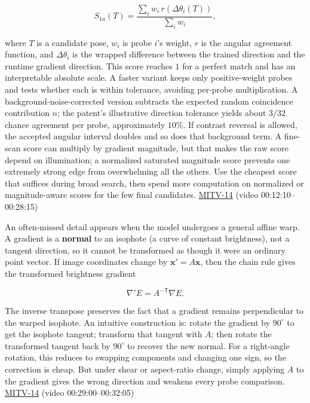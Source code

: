 \[
S_{1a}(T)=\frac{\sum_i w_i\,r(\Delta\theta_i(T))}{\sum_i w_i},
\]

where \(T\) is a candidate pose, \(w_i\) is probe \(i\)'s weight, \(r\) is the angular agreement function, and \(\Delta\theta_i\) is the wrapped difference between the trained direction and the runtime gradient direction. This score reaches \(1\) for a perfect match and has an interpretable absolute scale. A faster variant keeps only positive-weight probes and tests whether each is within tolerance, avoiding per-probe multiplication. A background-noise-corrected version subtracts the expected random coincidence contribution \(n\); the patent's illustrative direction tolerance yields about \(3/32\) chance agreement per probe, approximately \(10\%\). If contrast reversal is allowed, the accepted angular interval doubles and so does that background term. A fine-scan score can multiply by gradient magnitude, but that makes the raw score depend on illumination; a normalized saturated magnitude score prevents one extremely strong edge from overwhelming all the others. Use the cheapest score that suffices during broad search, then spend more computation on normalized or magnitude-aware scores for the few final candidates. \hyperref[04-visual-computing-ii-ch036-mitv-14---inspection-in-patquick-hough-transform-homography-position-determination-multi-scale]{MITV-14} (video 00:12:10--00:28:15)

An often-missed detail appears when the model undergoes a general affine warp. A gradient is a \textbf{normal} to an isophote (a curve of constant brightness), not a tangent direction, so it cannot be transformed as though it were an ordinary point vector. If image coordinates change by \(\mathbf{x}'=A\mathbf{x}\), then the chain rule gives the transformed brightness gradient

\[
\nabla' E=A^{-\mathsf T}\nabla E.
\]

The inverse transpose preserves the fact that a gradient remains perpendicular to the warped isophote. An intuitive construction is: rotate the gradient by \(90^\circ\) to get the isophote tangent; transform that tangent with \(A\); then rotate the transformed tangent back by \(90^\circ\) to recover the new normal. For a right-angle rotation, this reduces to swapping components and changing one sign, so the correction is cheap. But under shear or aspect-ratio change, simply applying \(A\) to the gradient gives the wrong direction and weakens every probe comparison. \hyperref[04-visual-computing-ii-ch036-mitv-14---inspection-in-patquick-hough-transform-homography-position-determination-multi-scale]{MITV-14} (video 00:29:00--00:32:05)


